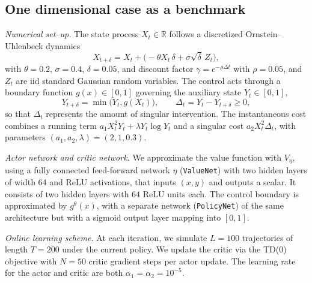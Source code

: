\documentclass[11pt]{amsart}
\theoremstyle{plain}
\numberwithin{equation}{section}
\begin{document}
\subsection{One dimensional case as a benchmark}
\medskip

\emph{Numerical set--up.}
The state process 
$X_t\in\mathbb{R}$ follows a discretized Ornstein--Uhlenbeck dynamics
\[
X_{t+\delta}
= X_t + \big(-\theta X_t\,\delta  + \sigma \sqrt{\delta }\,Z_t\big),
\]
with $\theta=0.2$, $\sigma=0.4$, $\delta =0.05$, and discount factor
$\gamma = e^{-\rho\Delta t}$ with $\rho=0.05$, and $Z_t$ are iid standard Gaussian random variables.
The control acts through a boundary function $g(x)\in[0,1]$ governing the auxiliary state $Y_t\in[0,1]$,
\[
Y_{t+\delta} = \min\big(Y_t, g(X_t)\big), \qquad \Delta_t = Y_t - Y_{t+\delta}\ge 0,
\]
so that $\Delta_t$ represents the amount of singular intervention.
The instantaneous cost combines a running term
$a_1 X_t^2 Y_t + \lambda Y_t\log Y_t$ and a singular cost $a_2 X_t^2\Delta_t$,
with parameters $(a_1,a_2,\lambda) = (2,1,0.3)$.



\medskip
\emph{Actor network and critic network.}
We approximate the value function with $V_\eta$, using a   fully connected feed-forward network $\eta$ ({\tt ValueNet}) with two hidden layers of width 64 and ReLU activations, that inputs $(x,y)$
and outputs a scalar. It consists of two hidden layers with 64 ReLU units each.
The control boundary  is approximated by $g^\theta(x)$, with a separate network ({\tt PolicyNet})
of the same architecture but with a sigmoid output layer mapping into $[0,1]$. %

\medskip

\emph{Online learning scheme.}
At each iteration, we simulate $L=100$ trajectories of length $T=200$
under the current policy.
We update the critic via the TD(0) objective with $N=50$ critic gradient steps per actor update.
The learning rate for the actor and critic are both $\alpha_1=\alpha_2=10^{-5}$.


\end{document}
